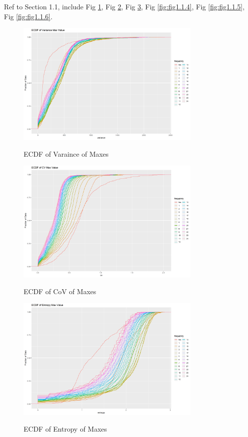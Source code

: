 \documentclass{article}
\begin{document}
Ref to Section 1.1, include Fig \ref{fig:fig1.1.1}, Fig \ref{fig:fig1.1.2}, Fig
\ref{fig:fig1.1.3}, Fig \ref{fig:fig1.1.4}, Fig \ref{fig:fig1.1.5}, Fig
\ref{fig:fig1.1.6}.

\begin{figure}[htbp]
\caption{ECDF of Varaince of Maxes}
\centering
\includegraphics[width = 0.8\textwidth]{ECDFofVarianceMaxValue}
\label{fig:fig1.1.1}
\end{figure}

\begin{figure}[htbp]
\caption{ECDF of CoV of Maxes}
\centering
\includegraphics[width = 0.8\textwidth]{ECDFofCVMaxValue}
\label{fig:fig1.1.2}
\end{figure}

\begin{figure}[htbp]
\caption{ECDF of Entropy of Maxes}
\centering
\includegraphics[width = 0.8\textwidth]{ECDFofEntropyMaxValue}
\label{fig:fig1.1.3}
\end{figure}
\end{document}
